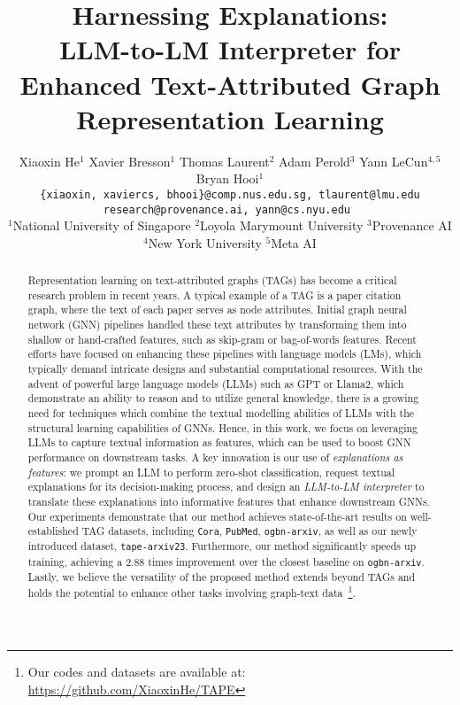 \documentclass{article}
\title{Harnessing Explanations: \\LLM-to-LM Interpreter for Enhanced Text-Attributed Graph Representation Learning}
\author{\hspace{-0.4cm}
  Xiaoxin He$^{1}$ 
  \hspace{0.05cm}
  Xavier Bresson$^1$
  \hspace{0.05cm}
  Thomas Laurent$^2$ 
  \hspace{0.05cm}
  Adam Perold$^3$
  \hspace{0.05cm}
  Yann LeCun$^{4,5}$
  \hspace{0.05cm}
  Bryan Hooi$^1$
  \vspace{0.15cm} \\
  \texttt{\{xiaoxin, xaviercs, bhooi\}@comp.nus.edu.sg, tlaurent@lmu.edu}\\
  \texttt{research@provenance.ai, yann@cs.nyu.edu }
  \vspace{0.15cm} \\
  {\normalfont $^1$National University of Singapore \hspace{0.18cm} $^2$Loyola Marymount University \hspace{0.18cm} $^3$Provenance AI}\\
  $^4$New York University \hspace{0.18cm} $^5$Meta AI
}
\begin{document}
\maketitle




\begin{abstract}
Representation learning on text-attributed graphs (TAGs) has become a critical research problem in recent years. A typical example of a TAG is a paper citation graph, where the text of each paper serves as node attributes. Initial graph neural network (GNN) pipelines handled these text attributes by transforming them into shallow or hand-crafted features, such as skip-gram or bag-of-words features. Recent efforts have focused on enhancing these pipelines with language models (LMs), which typically demand intricate designs and substantial computational resources. With the advent of powerful large language models (LLMs) such as GPT or Llama2, which demonstrate an ability to reason and to utilize general knowledge, there is a growing need for techniques which combine the textual modelling abilities of LLMs with the structural learning capabilities of GNNs. Hence, in this work, we focus on leveraging LLMs to capture textual information as features, which can be used to boost GNN performance on downstream tasks. A key innovation is our use of \emph{explanations as features}: we prompt an LLM to perform zero-shot classification, request textual explanations for its decision-making process, and design an \emph{LLM-to-LM interpreter} to translate these explanations into informative features that enhance downstream GNNs. Our experiments demonstrate that our method achieves state-of-the-art results on well-established TAG datasets, including \texttt{Cora}, \texttt{PubMed}, \texttt{ogbn-arxiv}, as well as our newly introduced dataset, \texttt{tape-arxiv23}. Furthermore, our method significantly speeds up training, achieving a 2.88 times improvement over the closest baseline on \texttt{ogbn-arxiv}. Lastly, we believe the versatility of the proposed method extends beyond TAGs and holds the potential to enhance other tasks involving graph-text data~\footnote{Our codes and datasets are available at: \url{https://github.com/XiaoxinHe/TAPE}}.
\end{abstract}
\end{document}
